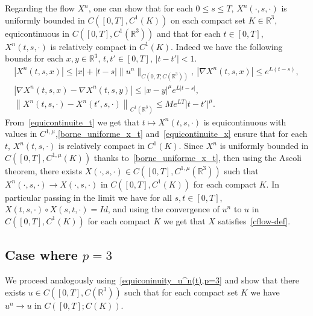 \documentclass[AHL,Unicode,longabstracts,published]{cedram}
\newcommand{\R}{\mathbb{R}}
\renewcommand{\leq}{\leqslant}
\begin{document}
Regarding the flow $X^n$, one can show that for each $0 \leq s\leq T $, $X^n(\cdot,s,\cdot) $ is uniformly bounded in $ C([0,T], C^{1}(K))$ on each compact set $K\in \R^3$, equicontinuous in $ C([0,T], C^{1}(\R^3))$ and that for each $t\in[0,T]$, $X^n(t,s,\cdot)$ is relatively compact in $ C^{1}(K)$. Indeed we have the following bounds for each $x,y \in \R^3 $, $t,t'\in[0,T]$, $|t-t'|<1$.
\begin{gather}
\left|X^n(t,s,x)\right| \leq |x|+ |t-s| \|u^n\|_{ C\left(0,T; C(\R^3)\right)},\: \left|\nabla X^n(t,s,x)\right|\leq e^{L(t-s)},\label{borne_uniforme_x_t}
\\ 
\left|\nabla X^n(t,s,x)-\nabla X^n(t,s,y)\right| \leq |x-y|^\mu e^{L |t-s|},\label{equicontinuite_x}
\\ 
\left\|X^n(t,s,\cdot)-X^n(t',s,\cdot)\right\|_{ C^{1}(\R^3)} \leq Me^{LT}|t-t'|^\mu.\label{equicontinuite_t}
\end{gather}
From~\eqref{equicontinuite_t} we get that $t\mapsto X^n(t,s,\cdot) $ is equicontinuous with values in $ C^{1,\mu}$,\eqref{borne_uniforme_x_t} and~\eqref{equicontinuite_x} ensure that for each $t$, $X^n(t,s,\cdot) $ is relatively compact in $ C^1(K)$. Since $X^n$ is uniformly bounded in $ C([0,T], C^{1,\mu}(K))$ thanks to~\eqref{borne_uniforme_x_t}, then using the Ascoli theorem, there exists $X(\cdot,s,\cdot)\in C([0,T], C^{1,\mu}(\R^3)) $ such that $X^n(\cdot,s,\cdot) \to X(\cdot,s,\cdot) $ in $ C([0,T], C^1(K)) $ for each compact $K$. In particular passing in the limit we have for all $s,t\in[0,T]$, $X(t,s,\cdot) \circ X(s,t,\cdot)= Id$, and using the convergence of $u^n$ to $u$ in $ C([0,T], C^1(K))$ for each compact $K$ we get that $X$ satisfies~\eqref{cflow-def}.

\subsection*{Case where \texorpdfstring{$p=3$}{p=3}}

We proceed analogously using~\eqref{equiconinuity_u^n(t),p=3} and show that there exists $u\in C([0,T], C(\R^3)) $ such that for each compact set $K$ we have $u^n\to u$ in $ C([0,T]; C(K))$.
\end{document}
